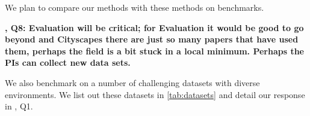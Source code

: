 \documentclass[12pt]{article}
\newcommand{\revThree}{{\color{my_magenta}{R3}}}
\newcommand{\revFour}{{\color{my_blue}{R4}}}
\begin{document}
    We plan to compare our methods with these methods on benchmarks. 

    \textbf{\revFour, Q8: Evaluation will be critical; for Evaluation it would be good to go beyond \kitti and Cityscapes there are just so many papers that have used them, perhaps the field is a bit stuck in a local minimum. Perhaps the PIs can collect new data sets.
    }

    We also benchmark on a number of challenging datasets with diverse environments. 
    We list out these datasets in \cref{tab:datasets} and detail our response in \revThree, Q1.


{\small


}
\end{document}

